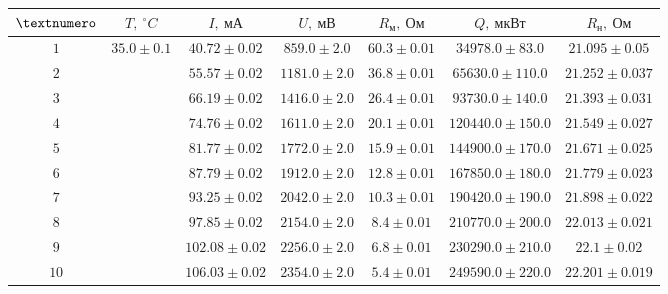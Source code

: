 \begin{tabular}{|c|c|c|c|c|c|c|}
  \hline
  $\textnumero$ & $T,\ ^\circ C$ & $I,\ мА$ & $U,\ мВ$ & $R_м,\ Ом$ & $Q,\ мкВт$ & $R_н,\ Ом$ \\ \hline
  $1$ & \multirow{10}{*}{$35.0 \pm 0.1$} & $40.72 \pm 0.02$ & $859.0 \pm 2.0$ & $60.3 \pm 0.01$ & $34978.0 \pm 83.0$ & $21.095 \pm 0.05$ \\ \cline{1-1} \cline{3-7}
  $2$ & & $55.57 \pm 0.02$ & $1181.0 \pm 2.0$ & $36.8 \pm 0.01$ & $65630.0 \pm 110.0$ & $21.252 \pm 0.037$ \\ \cline{1-1} \cline{3-7}
  $3$ & & $66.19 \pm 0.02$ & $1416.0 \pm 2.0$ & $26.4 \pm 0.01$ & $93730.0 \pm 140.0$ & $21.393 \pm 0.031$ \\ \cline{1-1} \cline{3-7}
  $4$ & & $74.76 \pm 0.02$ & $1611.0 \pm 2.0$ & $20.1 \pm 0.01$ & $120440.0 \pm 150.0$ & $21.549 \pm 0.027$ \\ \cline{1-1} \cline{3-7}
  $5$ & & $81.77 \pm 0.02$ & $1772.0 \pm 2.0$ & $15.9 \pm 0.01$ & $144900.0 \pm 170.0$ & $21.671 \pm 0.025$ \\ \cline{1-1} \cline{3-7}
  $6$ & & $87.79 \pm 0.02$ & $1912.0 \pm 2.0$ & $12.8 \pm 0.01$ & $167850.0 \pm 180.0$ & $21.779 \pm 0.023$ \\ \cline{1-1} \cline{3-7}
  $7$ & & $93.25 \pm 0.02$ & $2042.0 \pm 2.0$ & $10.3 \pm 0.01$ & $190420.0 \pm 190.0$ & $21.898 \pm 0.022$ \\ \cline{1-1} \cline{3-7}
  $8$ & & $97.85 \pm 0.02$ & $2154.0 \pm 2.0$ & $8.4 \pm 0.01$ & $210770.0 \pm 200.0$ & $22.013 \pm 0.021$ \\ \cline{1-1} \cline{3-7}
  $9$ & & $102.08 \pm 0.02$ & $2256.0 \pm 2.0$ & $6.8 \pm 0.01$ & $230290.0 \pm 210.0$ & $22.1 \pm 0.02$ \\ \cline{1-1} \cline{3-7}
  $10$ & & $106.03 \pm 0.02$ & $2354.0 \pm 2.0$ & $5.4 \pm 0.01$ & $249590.0 \pm 220.0$ & $22.201 \pm 0.019$ \\ \hline
\end{tabular}